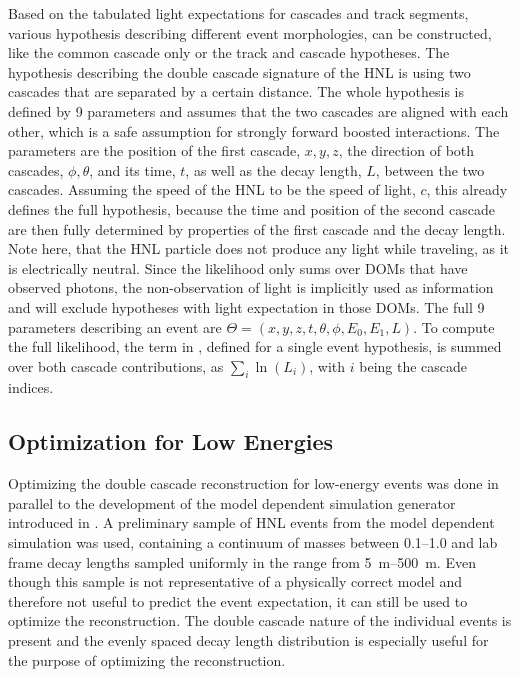 Based on the tabulated light expectations for cascades and track segments, various hypothesis describing different event morphologies, can be constructed, like the common cascade only or the track and cascade hypotheses. The hypothesis describing the double cascade signature of the HNL is using two cascades that are separated by a certain distance. The whole hypothesis is defined by 9 parameters and assumes that the two cascades are aligned with each other, which is a safe assumption for strongly forward boosted interactions. The parameters are the position of the first cascade, $x, y, z$, the direction of both cascades, $\phi, \theta$, and its time, $t$, as well as the decay length, $L$, between the two cascades. Assuming the speed of the HNL to be the speed of light, $c$, this already defines the full hypothesis, because the time and position of the second cascade are then fully determined by properties of the first cascade and the decay length. Note here, that the HNL particle does not produce any light while traveling, as it is electrically neutral. Since the likelihood only sums over DOMs that have observed photons, the non-observation of light is implicitly used as information and will exclude hypotheses with light expectation in those DOMs. The full 9 parameters describing an event are $\Theta = (x, y, z, t, \theta, \phi, E_0, E_1, L)$. To compute the full likelihood, the term in , defined for a single event hypothesis, is summed over both cascade contributions, as $\sum_i \ln(L_i)$, with $i$ being the cascade indices.


\subsection{Optimization for Low Energies}

Optimizing the double cascade reconstruction for low-energy events was done in parallel to the development of the model dependent simulation generator introduced in . A preliminary sample of HNL events from the model dependent simulation was used, containing a continuum of masses between \SIrange[range-phrase=~and~]{0.1}{1.0}{\gev} and lab frame decay lengths sampled uniformly in the range from \SIrange{5}{500}{\meter}. Even though this sample is not representative of a physically correct model and therefore not useful to predict the event expectation, it can still be used to optimize the reconstruction. The double cascade nature of the individual events is present and the evenly spaced decay length distribution is especially useful for the purpose of optimizing the reconstruction.

